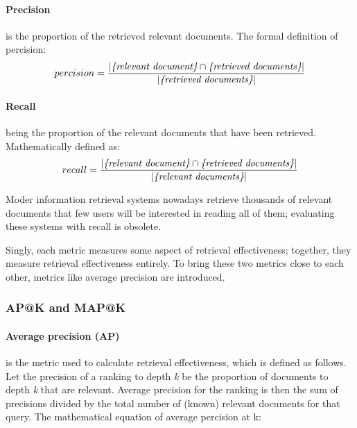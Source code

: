\paragraph*{Precision} is the proportion of the retrieved relevant documents. The formal definition of percision:
\begin{equation}
	percision = \frac{|\emph{\{relevant document\}} \cap \emph{\{retrieved documents\}}|}{|\emph{\{retrieved documents\}}|}
	\label{eq:percision}
\end{equation}

\paragraph*{Recall} being the proportion of the relevant documents that have been retrieved. Mathematically defined as:
\begin{equation}
	recall = \frac{|\emph{\{relevant document\}} \cap \emph{\{retrieved documents\}}|}{|\emph{\{relevant documents\}}|}
	\label{eq:recall}
\end{equation}

Moder information retrieval systems nowadays retrieve thousands of relevant documents that few users will be interested in reading all of them; evaluating these systems with recall is obsolete.

Singly, each metric measures some aspect of retrieval effectiveness; together, they measure retrieval effectiveness entirely. To bring these two metrics close to each other, metrics like average precision are introduced.

\subsubsection{AP@K and MAP@K}
\label{AP@K and MAP@K}
\paragraph*{Average precision (AP)} is the metric used to calculate retrieval effectiveness, which is defined as follows. 
Let the precision of a ranking to depth \emph{k} be
the proportion of documents to depth \emph{k} that are relevant.
Average precision for the ranking is then the sum of precisions divided by the total number of (known) relevant documents for that query.
The mathematical equation of average percision at k:

